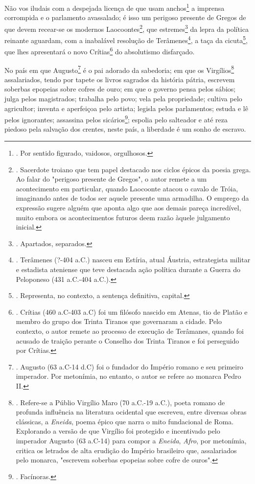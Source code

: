 Não vos iludais com a despejada licença de que usam anchos\footnote{.
  Por sentido figurado, vaidosos, orgulhosos.} a imprensa corrompida e o
parlamento avassalado; é isso um perigoso presente de Gregos de que
devem recear-se os modernos Laocoontes\footnote{. Sacerdote troiano que
  tem papel destacado nos ciclos épicos da poesia grega. Ao falar do
  "perigoso presente de Gregos", o autor remete a um acontecimento em
  particular, quando Laocoonte atacou o cavalo de Tróia, imaginando
  antes de todos ser aquele presente uma armadilha. O emprego da
  expressão sugere alguém que aponta algo que aos demais pareça
  incredível, muito embora os acontecimentos futuros deem razão àquele
  julgamento inicial.}, que estremes\footnote{. Apartados, separados.}
da lepra da política reinante aguardam, com a inabalável resolução de
Terâmenes\footnote{. Terâmenes (?-404 a.C.) nasceu em Estíria, atual
  Áustria, estrategista militar e estadista ateniense que teve destacada
  ação política durante a Guerra do Peloponeso (431 a.C.-404 a.C.).}, a
taça da cicuta\footnote{. Representa, no contexto, a sentença
  definitiva, capital.}, que lhes apresentará o novo Crítias\footnote{.
  Crítias (460 a.C-403 a.C) foi um filósofo nascido em Atenas, tio de
  Platão e membro do grupo dos Trinta Tiranos que governaram a cidade.
  Pelo contexto, o autor remete ao processo de execução de Terâmanes,
  quando foi acusado de traição perante o Conselho dos Trinta Tiranos e
  foi perseguido por Crítias.} do absolutismo disfarçado.

No país em que Augusto\footnote{. Augusto (63 a.C-14 d.C) foi o fundador
  do Império romano e seu primeiro imperador. Por metonímia, no entanto,
  o autor se refere ao monarca Pedro II.} é o pai adorado da sabedoria;
em que os Virgílios\footnote{. Refere-se a Públio Virgílio Maro (70
  a.C.-19 a.C.), poeta romano de profunda influência na literatura
  ocidental que escreveu, entre diversas obras clássicas, a
  \emph{Eneida}, poema épico que narra o mito fundacional de Roma.
  Explorando a versão de que Virgílio foi protegido e incentivado pelo
  imperador Augusto (63 a.C-14) para compor a \emph{Eneida},
  \emph{Afro}, por metonímia, critica os letrados de alta erudição do
  Império brasileiro que, assalariados pelo monarca, "escrevem soberbas
  epopeias sobre cofre de ouros".} assalariados, tendo por tapete os
livros sagrados da história pátria, escrevem soberbas epopeias sobre
cofres de ouro; em que o governo pensa pelos sábios; julga pelos
magistrados; trabalha pelo povo; vela pela propriedade; cultiva pelo
agricultor; inventa e aperfeiçoa pelo artista; legisla pelos
parlamentos; estuda e lê pelos ignorantes; assassina pelos
sicários\footnote{. Facínoras.}; espolia pelo salteador e até reza
piedoso pela salvação dos crentes, neste país, a liberdade é um sonho de
escravo.

